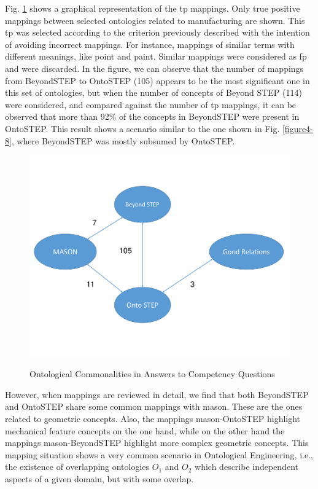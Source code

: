 Fig. \ref{figure4-9} shows a graphical representation of the \gls{tp} mappings.  Only true positive mappings  between selected ontologies related to manufacturing are shown. This \gls{tp} was selected according to the criterion previously described with the intention of avoiding incorrect mappings. For instance, mappings of similar terms with different meanings, like point and paint. Similar mappings were considered as \gls{fp} and were discarded. In the figure, we can observe that the number of mappings from BeyondSTEP to OntoSTEP (105) appears to be the most significant one in this set of ontologies, but when the number of concepts of Beyond STEP (114) were considered, and compared against the number of \gls{tp} mappings, it can be observed that more than 92\% of the concepts in BeyondSTEP were present in OntoSTEP. This result shows a scenario similar to the one shown in Fig. \ref{figure4-8}, where BeyondSTEP was mostly subsumed by OntoSTEP.  


\begin{figure}
	\begin{center}
		\includegraphics[scale=0.5]{figure-chapterIV/fig4-9}\\
		\caption{Ontological Commonalities in Answers to Competency Questions}
		\label{figure4-9}
	\end{center}
\end{figure}



However, when mappings are reviewed in detail, we find that both BeyondSTEP and OntoSTEP share some common mappings with \gls{mason}. These are the ones related to geometric concepts. Also, the mappings \gls{mason}-OntoSTEP highlight mechanical feature concepts on the one hand, while on the other hand the mappings   \gls{mason}-BeyondSTEP highlight more complex geometric concepts. This mapping situation shows a very common scenario in Ontological Engineering, i.e., the existence of    overlapping ontologies $O_{1}$ and $O_{2}$ which describe independent aspects of a given domain, but with some overlap. 

